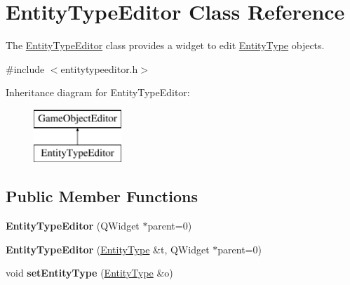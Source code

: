 \hypertarget{class_entity_type_editor}{\section{\-Entity\-Type\-Editor \-Class \-Reference}
\label{class_entity_type_editor}
}


\-The \hyperlink{class_entity_type_editor}{\-Entity\-Type\-Editor} class provides a widget to edit \hyperlink{class_entity_type}{\-Entity\-Type} objects.  




{\ttfamily \#include $<$entitytypeeditor.\-h$>$}

\-Inheritance diagram for \-Entity\-Type\-Editor\-:\begin{figure}[H]
\begin{center}
\leavevmode
\includegraphics[height=2.000000cm]{class_entity_type_editor}
\end{center}
\end{figure}
\subsection*{\-Public \-Member \-Functions}
\begin{DoxyCompactItemize}
\item 
\hypertarget{class_entity_type_editor_a9df2427d700e2eb37f1feb5b8ab33776}{{\bfseries \-Entity\-Type\-Editor} (\-Q\-Widget $\ast$parent=0)}\label{class_entity_type_editor_a9df2427d700e2eb37f1feb5b8ab33776}

\item 
\hypertarget{class_entity_type_editor_a9219588739854e779b2abfd6a8492f94}{{\bfseries \-Entity\-Type\-Editor} (\hyperlink{class_entity_type}{\-Entity\-Type} \&t, \-Q\-Widget $\ast$parent=0)}\label{class_entity_type_editor_a9219588739854e779b2abfd6a8492f94}

\item 
\hypertarget{class_entity_type_editor_a04ed3602a0004687d7cb945ccbf672de}{void {\bfseries set\-Entity\-Type} (\hyperlink{class_entity_type}{\-Entity\-Type} \&o)}\label{class_entity_type_editor_a04ed3602a0004687d7cb945ccbf672de}

\end{DoxyCompactItemize}


